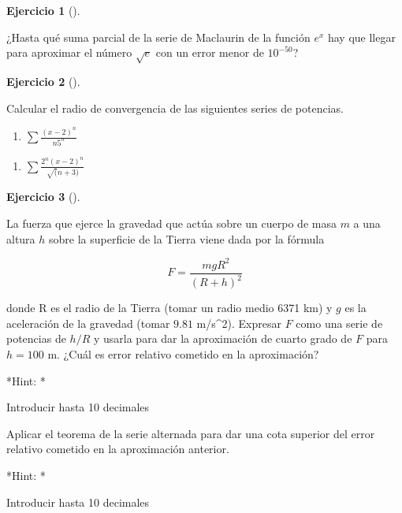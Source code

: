 \documentclass[
  a4paper,
]{scrreport}
\providecommand{\tightlist}{%
  \setlength{\itemsep}{0pt}\setlength{\parskip}{0pt}}\usepackage{longtable,booktabs,array}
\theoremstyle{definition}
\newtheorem{exercise}{Ejercicio}[chapter]
\theoremstyle{remark}
\begin{document}
\begin{exercise}[]\protect\hypertarget{exr-series-propuesto-3}{}\label{exr-series-propuesto-3}

¿Hasta qué suma parcial de la serie de Maclaurin de la función \(e^x\)
hay que llegar para aproximar el número \(\sqrt{e}\) con un error menor
de \(10^{-50}\)?

\vspace{18pt}

\end{exercise}

\begin{exercise}[]\protect\hypertarget{exr-series-propuesto-4}{}\label{exr-series-propuesto-4}

Calcular el radio de convergencia de las siguientes series de potencias.

\begin{enumerate}
\def\labelenumi{\alph{enumi}.}
\tightlist
\item
  \(\sum \frac{(x-2)^n}{n5^n}\)
\end{enumerate}

\vspace{18pt}

\begin{enumerate}
\def\labelenumi{\alph{enumi}.}
\setcounter{enumi}{1}
\tightlist
\item
  \(\sum \frac{2^n(x-2)^n}{\sqrt(n+3)}\)
\end{enumerate}

\vspace{18pt}

\end{exercise}

\begin{exercise}[]\protect\hypertarget{exr-series-propuesto-5}{}\label{exr-series-propuesto-5}

La fuerza que ejerce la gravedad que actúa sobre un cuerpo de masa \(m\)
a una altura \(h\) sobre la superficie de la Tierra viene dada por la
fórmula

\[
F = \frac{mgR^2}{(R+h)^2}
\]

donde R es el radio de la Tierra (tomar un radio medio 6371 km) y \(g\)
es la aceleración de la gravedad (tomar \(9.81\) m/s\^{}2). Expresar
\(F\) como una serie de potencias de \(h/R\) y usarla para dar la
aproximación de cuarto grado de \(F\) para \(h=100\) m. ¿Cuál es error
relativo cometido en la aproximación?

\vspace{18pt}*Hint: *

Introducir hasta 10 decimales

Aplicar el teorema de la serie alternada para dar una cota superior del
error relativo cometido en la aproximación anterior.

\vspace{18pt}*Hint: *

Introducir hasta 10 decimales

\end{exercise}
\end{document}
